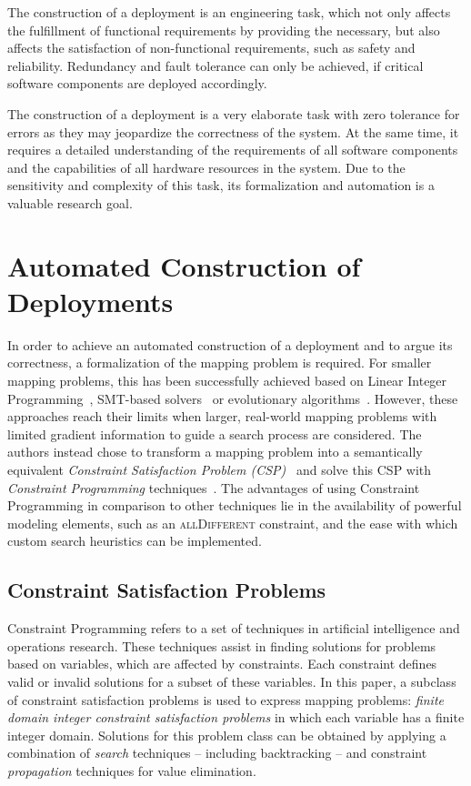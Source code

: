 \documentclass[english,biblatex]{lni}
\begin{document}
The construction of a deployment is an engineering task, which not only affects the fulfillment of functional requirements by providing the necessary, but also affects the satisfaction of non-functional requirements, such as safety and reliability.
Redundancy and fault tolerance can only be achieved, if critical software components are deployed accordingly.

The construction of a deployment is a very elaborate task with zero tolerance for errors as they may jeopardize the correctness of the system.
At the same time, it requires a detailed understanding of the requirements of all software components and the capabilities of all hardware resources in the system.
Due to the sensitivity and complexity of this task, its formalization and automation is a valuable research goal.

\section{Automated Construction of Deployments}

In order to achieve an automated construction of a deployment and to argue its correctness, a formalization of the mapping problem is required.
For smaller mapping problems, this has been successfully achieved based on Linear Integer Programming~\cite{Damm2006, Kugele2009}, SMT-based solvers~\cite{Voss2013} or evolutionary algorithms~\cite{White2011}.
However, these approaches reach their limits when larger, real-world mapping problems with limited gradient information to guide a search process are considered.
The authors instead chose to transform a mapping problem into a semantically equivalent \emph{Constraint Satisfaction Problem (CSP)}~\cite{Apt2003} and solve this CSP with \emph{Constraint Programming} techniques~\cite{Rossi2006}.
The advantages of using Constraint Programming in comparison to other techniques lie in the availability of powerful modeling elements, such as an \textsc{allDifferent} constraint, and the ease with which custom search heuristics can be implemented.

\subsection{Constraint Satisfaction Problems}
Constraint Programming refers to a set of techniques in artificial intelligence and operations research.
These techniques assist in finding solutions for problems based on variables, which are affected by constraints.
Each constraint defines valid or invalid solutions for a subset of these variables.
In this paper, a subclass of constraint satisfaction problems is used to express mapping problems:  \emph{finite domain integer constraint satisfaction problems} in which each variable has a finite integer domain.
Solutions for this problem class can be obtained by applying a combination of \emph{search} techniques -- including backtracking -- and constraint \emph{propagation} techniques for value elimination.
\end{document}
